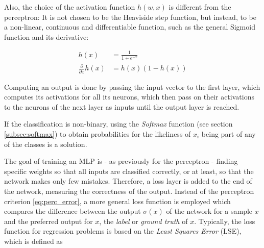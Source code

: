 \noindent Also, the choice of the activation function $h(w, x)$ is different from the perceptron: It is not chosen to be the Heaviside step function, but instead, to be a non-linear, continuous and differentiable function, such as the general Sigmoid function and its derivative:

\begin {align}
	 h(x) &= \frac{1}{1 + e^{-x}}\\
	\frac{\partial}{\partial x} h(x) &= h(x)(1 - h(x))
\end {align}

\noindent Computing an output is done by passing the input vector to the first layer, which computes its activations for all its neurons, which then pass on their activations to the neurons of the next layer as inputs until the output layer is reached.

If the classification is non-binary, using the \textit{Softmax} function (see section \ref{subsec:softmax}) to obtain probabilities for the likeliness of $x_i$ being part of any of the classes is a solution.\\


\noindent The goal of training an MLP is - as previously for the perceptron - finding specific weights so that all inputs are classified correctly, or at least, so that the network makes only few mistakes. Therefore, a loss layer is added to the end of the network, measuring the correctness of the output. Instead of the perceptron criterion \ref{eq:perc_error}, a more general loss function is employed which compares the difference between the output $\sigma(x)$ of the network for a sample $x$ and the preferred output for $x$, the \textit{label} or \textit{ground truth} of $x$. Typically, the loss function for regression problems is based on the \textit{Least Squares Error} (LSE), which is defined as

